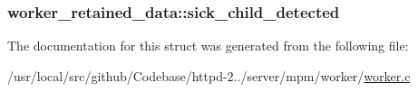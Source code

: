 \subsubsection[{\texorpdfstring{sick\+\_\+child\+\_\+detected}{sick_child_detected}}]{ worker\+\_\+retained\+\_\+data\+::sick\+\_\+child\+\_\+detected}\hypertarget{structworker__retained__data_a5c8df45aeb343a3c4857c07702730b4a}{}\label{structworker__retained__data_a5c8df45aeb343a3c4857c07702730b4a}


The documentation for this struct was generated from the following file\+:\begin{DoxyCompactItemize}
\item 
/usr/local/src/github/\+Codebase/httpd-\/2../server/mpm/worker/\hyperlink{worker_8c}{worker.\+c}\end{DoxyCompactItemize}
